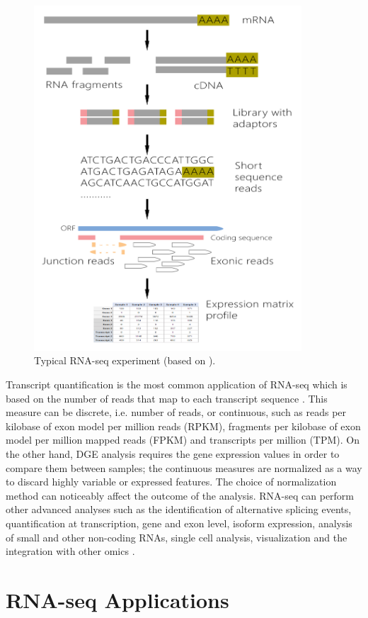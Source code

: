\begin{figure}[h]
    \centerline{\includegraphics[width = 10cm]{Figures/RNA-seq-process-mat.jpg}}
\caption{Typical RNA-seq experiment (based on \cite{Wang}).}
\label{fig:RNA-seq-process}
\end{figure}

Transcript quantification is the most common application of RNA-seq which is based on the number of reads that map to each transcript sequence \cite{Conesa2016}. This measure can be discrete, i.e. number of reads, or continuous, such as reads per kilobase of exon model per million reads (RPKM), fragments per kilobase of exon model per million mapped reads (FPKM) and transcripts per million (TPM). On the other hand, DGE analysis requires the gene expression values in order to compare them between samples; the continuous measures are normalized as a way to discard highly variable or expressed features. The choice of normalization method can noticeably affect the outcome of the analysis. RNA-seq can perform other advanced analyses such as the identification of alternative splicing events, quantification at transcription, gene and exon level, isoform expression, analysis of small and other non-coding RNAs, single cell analysis, visualization and the integration with other omics \cite{Conesa2016}.

\section{RNA-seq Applications}

